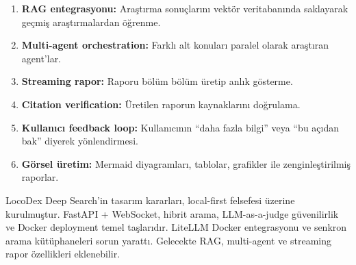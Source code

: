 \begin{enumerate}
  \item \textbf{RAG entegrasyonu:} Ara\c{s}t{\i}rma sonu\c{c}lar{\i}n{\i} vekt\"{o}r veritaban{\i}nda saklayarak ge\c{c}mi\c{s} ara\c{s}t{\i}rmalardan \"{o}\u{g}renme.
  \item \textbf{Multi-agent orchestration:} Farkl{\i} alt konular{\i} paralel olarak ara\c{s}t{\i}ran agent'lar.
  \item \textbf{Streaming rapor:} Raporu b\"{o}l\"{u}m b\"{o}l\"{u}m \"{u}retip anl{\i}k g\"{o}sterme.
  \item \textbf{Citation verification:} \"{U}retilen raporun kaynaklar{\i}n{\i} do\u{g}rulama.
  \item \textbf{Kullan{\i}c{\i} feedback loop:} Kullan{\i}c{\i}n{\i}n ``daha fazla bilgi'' veya ``bu a\c{c}{\i}dan bak'' diyerek y\"{o}nlendirmesi.
  \item \textbf{G\"{o}rsel \"{u}retim:} Mermaid diyagramlar{\i}, tablolar, grafikler ile zenginle\c{s}tirilmi\c{s} raporlar.
\end{enumerate}

\begin{ozet}
LocoDex Deep Search'in tasar{\i}m kararlar{\i}, local-first felsefesi \"{u}zerine kurulmu\c{s}tur. FastAPI + WebSocket, hibrit arama, LLM-as-a-judge g\"{u}venilirlik ve Docker deployment temel ta\c{s}lar{\i}d{\i}r. LiteLLM Docker entegrasyonu ve senkron arama k\"{u}t\"{u}phaneleri sorun yaratt{\i}. Gelecekte RAG, multi-agent ve streaming rapor \"{o}zellikleri eklenebilir.
\end{ozet}
